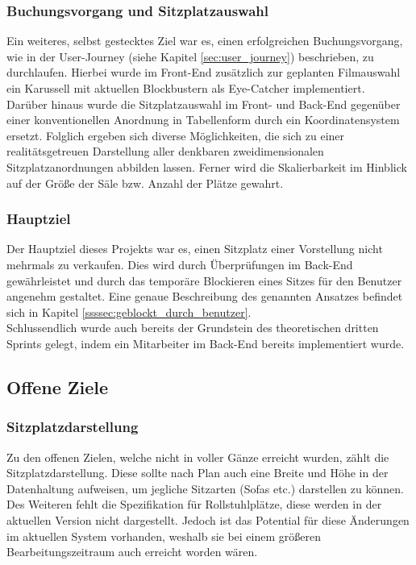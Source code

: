 \subsubsection*{Buchungsvorgang und Sitzplatzauswahl}
Ein weiteres, selbst gestecktes Ziel war es, einen erfolgreichen Buchungsvorgang, wie in der User-Journey (siehe Kapitel \vref{sec:user_journey}) beschrieben, zu durchlaufen.
Hierbei wurde im Front-End zusätzlich zur geplanten Filmauswahl ein Karussell mit aktuellen Blockbustern als Eye-Catcher implementiert. \\
Darüber hinaus wurde die Sitzplatzauswahl im Front- und Back-End gegenüber einer konventionellen Anordnung in Tabellenform durch ein Koordinatensystem ersetzt.
Folglich ergeben sich diverse Möglichkeiten, die sich zu einer realitätsgetreuen Darstellung aller denkbaren zweidimensionalen Sitzplatzanordnungen abbilden lassen.
Ferner wird die Skalierbarkeit im Hinblick auf der Größe der Säle bzw. Anzahl der Plätze gewahrt.

\subsubsection*{Hauptziel}
Der Hauptziel dieses Projekts war es, einen Sitzplatz einer Vorstellung nicht mehrmals zu verkaufen.
Dies wird durch Überprüfungen im Back-End gewährleistet und durch das temporäre Blockieren eines Sitzes für den Benutzer angenehm gestaltet.
Eine genaue Beschreibung des genannten Ansatzes befindet sich in Kapitel \vref{ssssec:geblockt_durch_benutzer}. \\

Schlussendlich wurde auch bereits der Grundstein des theoretischen dritten Sprints gelegt, indem ein Mitarbeiter im Back-End bereits implementiert wurde.

\subsection{Offene Ziele}
\label{ssec:offene_ziele}
\subsubsection*{Sitzplatzdarstellung}
Zu den offenen Zielen, welche nicht in voller Gänze erreicht wurden, zählt die Sitzplatzdarstellung.
Diese sollte nach Plan auch eine Breite und Höhe in der Datenhaltung aufweisen, um jegliche Sitzarten (Sofas etc.) darstellen zu können.
Des Weiteren fehlt die Spezifikation für Rollstuhlplätze, diese werden in der aktuellen Version nicht dargestellt.
Jedoch ist das Potential für diese Änderungen im aktuellen System vorhanden, weshalb sie bei einem größeren Bearbeitungszeitraum auch erreicht worden wären.

